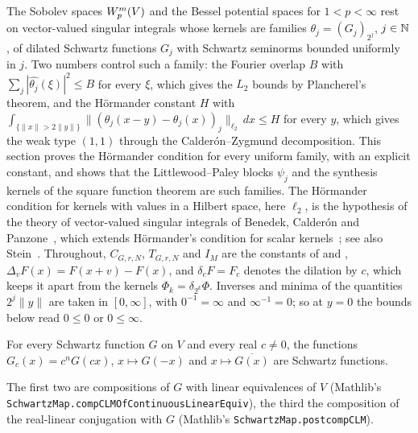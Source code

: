 The Sobolev spaces $W^{m}_{p}(V)$ and the Bessel potential spaces for $1 < p < \infty$ rest on
vector-valued singular integrals whose kernels are families $\theta_j = (G_j)_{2^j}$,
$j \in \mathbb{N}$, of dilated Schwartz functions $G_j$ with Schwartz seminorms bounded uniformly in
$j$. Two numbers control such a family: the Fourier overlap $B$ with
$\sum_j |\widehat{\theta_j}(\xi)|^2 \leq B$ for every $\xi$, which gives the $L_2$ bounds by
Plancherel's theorem, and the H\"ormander constant $H$ with
$\int_{\{\|x\| > 2\|y\|\}} \|(\theta_j(x - y) - \theta_j(x))_j\|_{\ell_2} \, dx \leq H$ for every
$y$, which gives the weak type $(1,1)$ through the Calder\'on--Zygmund decomposition. This
section proves the H\"ormander condition for every uniform family, with an explicit constant,
and shows that the Littlewood--Paley blocks $\psi_j$ and the synthesis kernels of the square
function theorem are such families. The H\"ormander condition for kernels with values in a
Hilbert space, here $\ell_2$, is the hypothesis of the theory of vector-valued singular
integrals of Benedek, Calder\'on and Panzone~\cite{BenedekCalderonPanzone}, which extends
H\"ormander's condition for scalar kernels~\cite{Hormander1960}; see also
Stein~\cite{SteinSingular}. Throughout, $C_{G,r,N}$, $T_{G,r,N}$ and
$I_M$ are the constants of  and ,
$\Delta_v F(x) = F(x + v) - F(x)$, and $\delta_c F = F_c$ denotes the dilation by $c$, which
keeps it apart from the kernels $\Phi_k = \delta_{2^k} \Phi$. Inverses and minima of the
quantities $2^j \|y\|$ are taken in $[0, \infty]$, with $0^{-1} = \infty$ and
$\infty^{-1} = 0$; so at $y = 0$ the bounds below read $0 \leq 0$ or $0 \leq \infty$.

\begin{definition}
\label{def:schwartz-dilate}
\leanok
{}
For every Schwartz function $G$ on $V$ and every real $c \neq 0$, the functions
$G_c(x) = c^n G(c x)$, $x \mapsto G(-x)$ and $x \mapsto \overline{G(x)}$ are Schwartz functions.
\end{definition}

The first two are compositions of $G$ with linear equivalences of $V$ (Mathlib's
\texttt{SchwartzMap.\allowbreak compCLMOfContinuousLinearEquiv}), the third the composition of
the real-linear conjugation with $G$ (Mathlib's \texttt{SchwartzMap.\allowbreak postcompCLM}).

